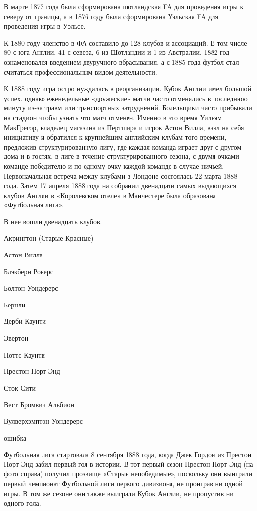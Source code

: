 В марте 1873 года была сформирована шотландская FA для проведения игры к северу от границы, а в 1876 году была сформирована Уэльская FA для проведения игры в Уэльсе.

К 1880 году членство в ФА составило до 128 клубов и ассоциаций. В том числе 80 с юга Англии, 41 с севера, 6 из Шотландии и 1 из Австралии. 1882 год ознаменовался введением двуручного вбрасывания, а с 1885 года футбол стал считаться профессиональным видом деятельности.

К 1888 году игра остро нуждалась в реорганизации. Кубок Англии имел большой успех, однако еженедельные «дружеские» матчи часто отменялись в последнюю минуту из-за травм или транспортных затруднений. Болельщики часто прибывали на стадион чтобы узнать что матч отменен. Именно в это время Уильям МакГрегор, владелец магазина из Пертшира и игрок Астон Вилла, взял на себя инициативу и обратился к крупнейшим английским клубам того времени, предложив структурированную лигу, где каждая команда играет друг с другом дома и в гостях, в лиге в течение структурированного сезона, с двумя очками команде-победителю и по одному очку каждой команде в случае ничьей. Первоначальная встреча между клубами в Лондоне состоялась 22 марта 1888 года. Затем 17 апреля 1888 года на собрании двенадцати самых выдающихся клубов Англии в «Королевском отеле» в Манчестере была образована «Футбольная лига».



В нее вошли двенадцать клубов.

Акрингтон (Старые Красные)

Астон Вилла

Блэкберн Роверс

Болтон Уондерерс

Бернли

Дерби Каунти 

Эвертон

Ноттс Каунти 

Престон Норт Энд

Сток Сити

Вест Бромвич Альбион

Вулверхэмптон Уондерерс





ошибка

Футбольная лига стартовала 8 сентября 1888 года, когда Джек Гордон из Престон Норт Энд забил первый гол в истории. В тот первый сезон Престон Норт Энд (на фото справа) получил прозвище «Старые непобедимые», поскольку они выиграли первый чемпионат Футбольной лиги первого дивизиона, не проиграв ни одной игры.  В том же сезоне они также выиграли Кубок Англии, не пропустив ни одного гола.

